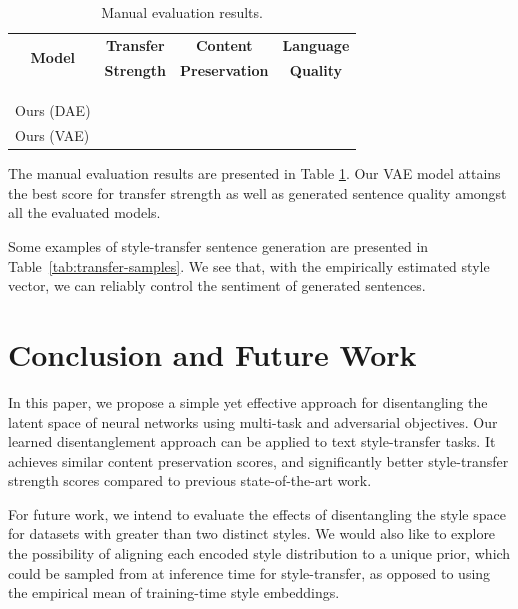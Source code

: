 \documentclass[letterpaper]{article} %
\newcommand{\tabh}[1]{\multicolumn{1}{c|}{\textbf{#1}}}
\newcommand{\tabc}[2]{\multicolumn{1}{|c||}{\multirow{#1}{*}{\textbf{#2}}}}
\begin{document}
\begin{table}[ht]
	\centering
	\begin{tabular}{| l || c | c | c | }
		\hline
		\tabc{2}{Model}                    & \tabh{Transfer} & \tabh{Content}      & \tabh{Language} \\
		                                   & \tabh{Strength} & \tabh{Preservation} & \tabh{Quality}  \\
		\hline
		\hline
		\citeauthor{shen2017style}         &                 &                     &                 \\
		\hline
		\citeauthor{fu2017style}           &                 &                     &                 \\
		\hline
		\citeauthor{zhao2018adversarially} &                 &                     &                 \\
		\hline
		Ours (DAE)                         &                 &                     &                 \\
		\hline
		Ours (VAE)                         &                 &                     &                 \\
		\hline
	\end{tabular}
	\caption{Manual evaluation results.}
	\label{tab:manual-evaluation}
\end{table}

The manual evaluation results are presented in Table \ref{tab:manual-evaluation}.
Our VAE model attains the best score for transfer strength as well as generated sentence quality amongst all the evaluated models.

Some examples of style-transfer sentence generation are presented in Table~\ref{tab:transfer-samples}.
We see that, with the empirically estimated style vector, we can reliably control the sentiment of generated sentences.

\section{Conclusion and Future Work}
In this paper, we propose a simple yet effective approach for disentangling the latent space of neural networks using multi-task and adversarial objectives.
Our learned disentanglement approach can be applied to text style-transfer tasks.
It achieves similar content preservation scores, and significantly better style-transfer strength scores compared to previous state-of-the-art work.

For future work, we intend to evaluate the effects of disentangling the style space for datasets with greater than two distinct styles.
We would also like to explore the possibility of aligning each encoded style distribution to a unique prior, which could be sampled from at inference time for style-transfer, as opposed to using the empirical mean of training-time style embeddings.
\end{document}
